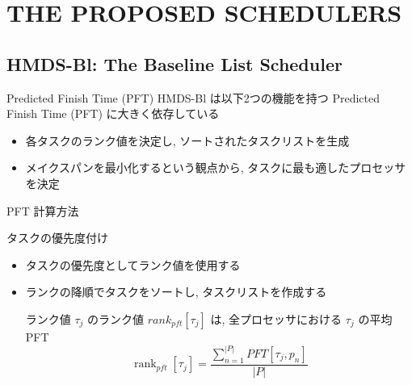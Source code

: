 
\section{THE PROPOSED SCHEDULERS}
\label{sec: the proposed schedulers}


\subsection{HMDS-Bl: The Baseline List Scheduler}
\label{ssec: hmds-bl: the baseline list scheduler}

\begin{frame}{Predicted Finish Time (PFT)}
    HMDS-Bl は以下2つの機能を持つ Predicted Finish Time (PFT) に大きく依存している
    \begin{itemize}
        \item 各タスクのランク値を決定し, ソートされたタスクリストを生成
        \item メイクスパンを最小化するという観点から, タスクに最も適したプロセッサを決定
    \end{itemize}
\end{frame}

\begin{frame}{PFT 計算方法}
\end{frame}

\begin{frame}{タスクの優先度付け}
    \begin{itemize}
        \item タスクの優先度としてランク値を使用する
        \item ランクの降順でタスクをソートし, タスクリストを作成する
              \begin{block}{ランク値}
                  $\tau_j$ のランク値 $rank_{pft}[\tau_j]$ は, 全プロセッサにおける $\tau_j$ の平均 PFT
                  \begin{equation*}
                      \operatorname{rank}_{p f t}\left[\tau_j\right]=\frac{\sum_{n=1}^{|P|} P F T\left[\tau_j, p_n\right]}{|P|}
                  \end{equation*}
              \end{block}
    \end{itemize}
\end{frame}

